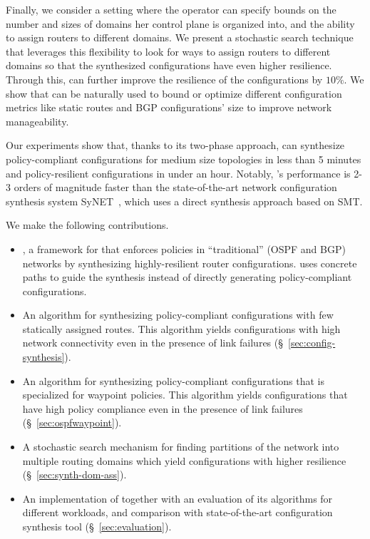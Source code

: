Finally, we consider a setting where the operator can 
specify bounds on the number and sizes of domains her
control plane is organized into, and the ability to assign routers to
different domains.  We present a stochastic search technique that
leverages this flexibility to look for ways to assign routers
to different domains so that the synthesized configurations have even
higher resilience.  Through this, \name can further
improve the resilience of the configurations 
by $10\%$. We show that \name can be naturally used to
bound or optimize different configuration metrics like static routes
and BGP configurations' size to improve network manageability. 

Our experiments show that, thanks to its two-phase approach,
\name can synthesize policy-compliant 
configurations for medium size topologies 
in less than 5 minutes and 
policy-resilient configurations in under an hour. 
Notably, \name's performance is 2-3
orders of magnitude faster than the state-of-the-art network
configuration synthesis system SyNET~\cite{synet}, which uses a direct
synthesis 
approach based on SMT. 

 We make the following contributions.
\begin{itemize}	
    \item \name, a framework for
	that enforces policies in ``traditional'' (OSPF and BGP) networks
	by synthesizing highly-resilient router configurations. 		
	\name  uses concrete
	paths to guide the synthesis  
	instead of directly generating policy-compliant
	configurations.

	\item An algorithm for synthesizing policy-compliant
          configurations with few statically assigned routes. This
          algorithm yields configurations with high network
          connectivity even in the presence of link failures
          (\S~\ref{sec:config-synthesis}).

	\item An algorithm for synthesizing policy-compliant 		
		 configurations that is specialized for waypoint policies. 
		 This algorithm yields configurations that have
		 high policy compliance even in the presence of link failures (\S~\ref{sec:ospfwaypoint}). 
	
	\item A stochastic search mechanism for finding 
		partitions of the network into multiple routing domains which
		yield configurations with higher resilience (\S~\ref{sec:synth-dom-ass}).
	
	\item An implementation of \name together with an evaluation
          of its algorithms for different workloads, and comparison with state-of-the-art
          configuration synthesis tool (\S~\ref{sec:evaluation}).
\end{itemize}
